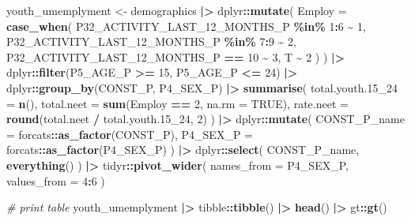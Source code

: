 \documentclass[
]{article}
\newenvironment{Shaded}{\begin{snugshade}}{\end{snugshade}}
\newcommand{\AttributeTok}[1]{\textcolor[rgb]{0.13,0.29,0.53}{#1}}
\newcommand{\CommentTok}[1]{\textcolor[rgb]{0.56,0.35,0.01}{\textit{#1}}}
\newcommand{\ConstantTok}[1]{\textcolor[rgb]{0.56,0.35,0.01}{#1}}
\newcommand{\DecValTok}[1]{\textcolor[rgb]{0.00,0.00,0.81}{#1}}
\newcommand{\FloatTok}[1]{\textcolor[rgb]{0.00,0.00,0.81}{#1}}
\newcommand{\FunctionTok}[1]{\textcolor[rgb]{0.13,0.29,0.53}{\textbf{#1}}}
\newcommand{\NormalTok}[1]{#1}
\newcommand{\OtherTok}[1]{\textcolor[rgb]{0.56,0.35,0.01}{#1}}
\newcommand{\SpecialCharTok}[1]{\textcolor[rgb]{0.81,0.36,0.00}{\textbf{#1}}}
\newenvironment{UNFPAShadedBox}{%
\begin{tcolorbox}[sharp corners, enhanced, colback=white, boxrule=0pt, borderline west={2pt}{0pt}{orange}]%
}{\end{tcolorbox}}
\newenvironment{Highlighting}{\begin{UNFPAShadedBox}}{\end{UNFPAShadedBox}}
\begin{document}
\begin{Shaded}
\begin{Highlighting}[]
\NormalTok{youth\_umemplyment }\OtherTok{\textless{}{-}} 
\NormalTok{  demographics }\SpecialCharTok{|\textgreater{}}
\NormalTok{  dplyr}\SpecialCharTok{::}\FunctionTok{mutate}\NormalTok{(}
    \AttributeTok{Employ =} \FunctionTok{case\_when}\NormalTok{(}
\NormalTok{      P32\_ACTIVITY\_LAST\_12\_MONTHS\_P }\SpecialCharTok{\%in\%} \DecValTok{1}\SpecialCharTok{:}\DecValTok{6} \SpecialCharTok{\textasciitilde{}} \DecValTok{1}\NormalTok{,}
\NormalTok{      P32\_ACTIVITY\_LAST\_12\_MONTHS\_P }\SpecialCharTok{\%in\%} \DecValTok{7}\SpecialCharTok{:}\DecValTok{9} \SpecialCharTok{\textasciitilde{}} \DecValTok{2}\NormalTok{,}
\NormalTok{      P32\_ACTIVITY\_LAST\_12\_MONTHS\_P }\SpecialCharTok{==} \DecValTok{10} \SpecialCharTok{\textasciitilde{}} \DecValTok{3}\NormalTok{,}
\NormalTok{      T }\SpecialCharTok{\textasciitilde{}} \DecValTok{2}
\NormalTok{    )}
\NormalTok{  ) }\SpecialCharTok{|\textgreater{}}
\NormalTok{  dplyr}\SpecialCharTok{::}\FunctionTok{filter}\NormalTok{(P5\_AGE\_P }\SpecialCharTok{\textgreater{}=} \DecValTok{15}\NormalTok{, P5\_AGE\_P }\SpecialCharTok{\textless{}=} \DecValTok{24}\NormalTok{) }\SpecialCharTok{|\textgreater{}}
\NormalTok{  dplyr}\SpecialCharTok{::}\FunctionTok{group\_by}\NormalTok{(CONST\_P, P4\_SEX\_P) }\SpecialCharTok{|\textgreater{}}
  \FunctionTok{summarise}\NormalTok{(}
    \AttributeTok{total.youth.15\_24 =} \FunctionTok{n}\NormalTok{(),}
    \AttributeTok{total.neet =} \FunctionTok{sum}\NormalTok{(Employ }\SpecialCharTok{==} \DecValTok{2}\NormalTok{, }\AttributeTok{na.rm =} \ConstantTok{TRUE}\NormalTok{),}
    \AttributeTok{rate.neet =} \FunctionTok{round}\NormalTok{(total.neet }\SpecialCharTok{/}\NormalTok{ total.youth}\FloatTok{.15}\NormalTok{\_24, }\DecValTok{2}\NormalTok{)}
\NormalTok{  ) }\SpecialCharTok{|\textgreater{}}
\NormalTok{  dplyr}\SpecialCharTok{::}\FunctionTok{mutate}\NormalTok{(}
    \AttributeTok{CONST\_P\_name =}\NormalTok{ forcats}\SpecialCharTok{::}\FunctionTok{as\_factor}\NormalTok{(CONST\_P),}
    \AttributeTok{P4\_SEX\_P =}\NormalTok{ forcats}\SpecialCharTok{::}\FunctionTok{as\_factor}\NormalTok{(P4\_SEX\_P)}
\NormalTok{  ) }\SpecialCharTok{|\textgreater{}}
\NormalTok{  dplyr}\SpecialCharTok{::}\FunctionTok{select}\NormalTok{(}
\NormalTok{    CONST\_P\_name,}
    \FunctionTok{everything}\NormalTok{()}
\NormalTok{  ) }\SpecialCharTok{|\textgreater{}}
\NormalTok{  tidyr}\SpecialCharTok{::}\FunctionTok{pivot\_wider}\NormalTok{(}
    \AttributeTok{names\_from =}\NormalTok{  P4\_SEX\_P,}
    \AttributeTok{values\_from =} \DecValTok{4}\SpecialCharTok{:}\DecValTok{6}
\NormalTok{  ) }

\CommentTok{\# print table}
\NormalTok{youth\_umemplyment }\SpecialCharTok{|\textgreater{}}
\NormalTok{  tibble}\SpecialCharTok{::}\FunctionTok{tibble}\NormalTok{() }\SpecialCharTok{|\textgreater{}}
  \FunctionTok{head}\NormalTok{() }\SpecialCharTok{|\textgreater{}}
\NormalTok{  gt}\SpecialCharTok{::}\FunctionTok{gt}\NormalTok{()}
\end{Highlighting}
\end{Shaded}
\end{document}
